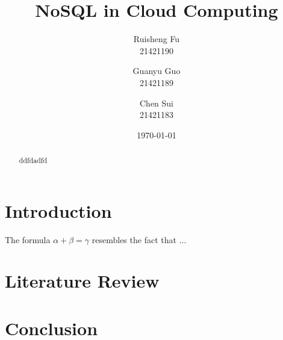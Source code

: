 \documentclass[10pt,a4paper]{article}
\author{Ruisheng Fu\\21421190\\
\and
Guanyu Guo\\21421189\\
\and
Chen Sui\\21421183}
\title{NoSQL in Cloud Computing}
\date{\today}
\begin{document}
\maketitle
\tableofcontents

\begin{abstract}
ddfdadfd
\end{abstract}

\section{Introduction}
The formula $\alpha + \beta = \gamma$ resembles the fact that ...\cite{Chang2006}

\section{Literature Review}

\section{Conclusion}


\end{document}
